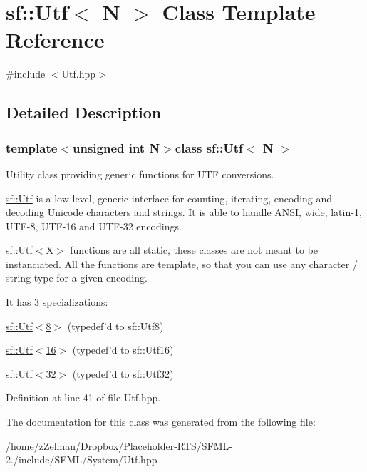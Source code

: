 \hypertarget{classsf_1_1Utf}{\section{sf\-:\-:Utf$<$ N $>$ Class Template Reference}
\label{classsf_1_1Utf}
}


{\ttfamily \#include $<$Utf.\-hpp$>$}



\subsection{Detailed Description}
\subsubsection*{template$<$unsigned int N$>$class sf\-::\-Utf$<$ N $>$}

Utility class providing generic functions for U\-T\-F conversions.

\hyperlink{classsf_1_1Utf}{sf\-::\-Utf} is a low-\/level, generic interface for counting, iterating, encoding and decoding Unicode characters and strings. It is able to handle A\-N\-S\-I, wide, latin-\/1, U\-T\-F-\/8, U\-T\-F-\/16 and U\-T\-F-\/32 encodings.

sf\-::\-Utf$<$\-X$>$ functions are all static, these classes are not meant to be instanciated. All the functions are template, so that you can use any character / string type for a given encoding.

It has 3 specializations\-: \begin{DoxyItemize}
\item \hyperlink{classsf_1_1Utf_3_018_01_4}{sf\-::\-Utf$<$8$>$} (typedef'd to sf\-::\-Utf8) \item \hyperlink{classsf_1_1Utf_3_0116_01_4}{sf\-::\-Utf$<$16$>$} (typedef'd to sf\-::\-Utf16) \item \hyperlink{classsf_1_1Utf_3_0132_01_4}{sf\-::\-Utf$<$32$>$} (typedef'd to sf\-::\-Utf32) \end{DoxyItemize}


Definition at line 41 of file Utf.\-hpp.



The documentation for this class was generated from the following file\-:\begin{DoxyCompactItemize}
\item 
/home/z\-Zelman/\-Dropbox/\-Placeholder-\/\-R\-T\-S/\-S\-F\-M\-L-\/2./include/\-S\-F\-M\-L/\-System/Utf.\-hpp\end{DoxyCompactItemize}

